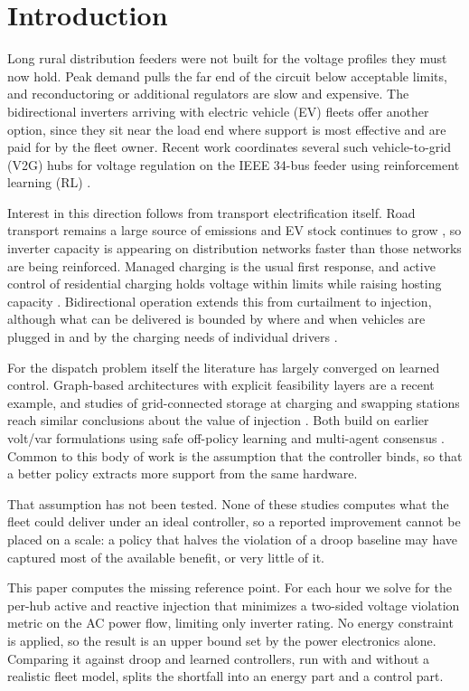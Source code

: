 \documentclass[conference,a4paper]{IEEEtran}
\begin{document}
\section{Introduction}

Long rural distribution feeders were not built for the voltage profiles they must now hold.
Peak demand pulls the far end of the circuit below acceptable limits, and reconductoring or
additional regulators are slow and expensive. The bidirectional inverters arriving with
electric vehicle (EV) fleets offer another option, since they sit near the load end where
support is most effective and are paid for by the fleet owner. Recent work coordinates
several such vehicle-to-grid (V2G) hubs for voltage regulation on the IEEE 34-bus feeder
using reinforcement learning (RL) \cite{wang2026v2g}.

Interest in this direction follows from transport electrification itself. Road transport
remains a large source of emissions and EV stock continues to grow \cite{iea2025}, so
inverter capacity is appearing on distribution networks faster than those networks are being
reinforced. Managed charging is the usual first response, and active control of residential
charging holds voltage within limits while raising hosting capacity \cite{nazir2024}.
Bidirectional operation extends this from curtailment to injection, although what can be
delivered is bounded by where and when vehicles are plugged in \cite{lee2025} and by the
charging needs of individual drivers \cite{chen2025}.

For the dispatch problem itself the literature has largely converged on learned control.
Graph-based architectures with explicit feasibility layers \cite{yan2024magrl} are a recent
example, and studies of grid-connected storage at charging and swapping stations reach
similar conclusions about the value of injection \cite{guldorum2024}. Both build on earlier
volt/var formulations using safe off-policy learning \cite{wang2020safe} and multi-agent
consensus \cite{gao2021consensus}. Common to this body of work is the assumption that the
controller binds, so that a better policy extracts more support from the same hardware.

That assumption has not been tested. None of these studies computes what the fleet could
deliver under an ideal controller, so a reported improvement cannot be placed on a scale: a
policy that halves the violation of a droop baseline may have captured most of the available
benefit, or very little of it.

This paper computes the missing reference point. For each hour we solve for the per-hub
active and reactive injection that minimizes a two-sided voltage violation metric on the AC
power flow, limiting only inverter rating. No energy constraint is applied, so the result is
an upper bound set by the power electronics alone. Comparing it against droop and learned
controllers, run with and without a realistic fleet model, splits the shortfall into an
energy part and a control part.
\end{document}
